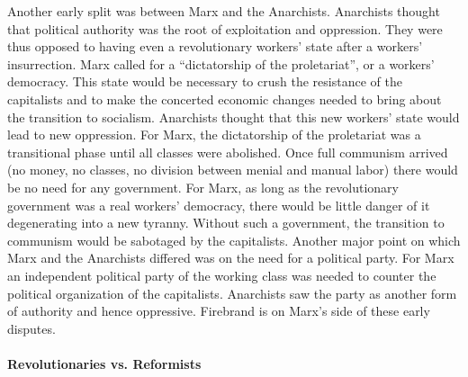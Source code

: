 Another early split was between Marx and the Anarchists. Anarchists thought that political authority was the root of exploitation and oppression. They were thus opposed to having even a revolutionary workers' state after a workers' insurrection. Marx called for a ``dictatorship of the proletariat'', or a workers' democracy. This state would be necessary to crush the resistance of the capitalists and to make the concerted economic changes needed to bring about the transition to socialism. Anarchists thought that this new workers' state would lead to new oppression. For Marx, the dictatorship of the proletariat was a transitional phase until all classes were abolished. Once full communism arrived (no money, no classes, no division between menial and manual labor) there would be no need for any government. For Marx, as long as the revolutionary government was a real workers' democracy, there would be little danger of it degenerating into a new tyranny. Without such a government, the transition to communism would be sabotaged by the capitalists. Another major point on which Marx and the Anarchists differed was on the need for a political party. For Marx an independent political party of the working class was needed to counter the political organization of the capitalists. Anarchists saw the party as another form of authority and hence oppressive. Firebrand is on Marx's side of these early disputes.

\paragraph{Revolutionaries vs. Reformists}

